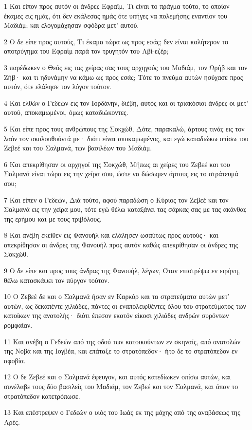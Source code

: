 \par 1 Και είπον προς αυτόν οι άνδρες Εφραΐμ, Τι είναι το πράγμα τούτο, το οποίον έκαμες εις ημάς, ότι δεν εκάλεσας ημάς ότε υπήγες να πολεμήσης εναντίον του Μαδιάμ; και ελογομάχησαν σφόδρα μετ' αυτού.
\par 2 Ο δε είπε προς αυτούς, Τι έκαμα τώρα ως προς εσάς; δεν είναι καλήτερον το αποτρύγημα του Εφραΐμ παρά τον τρυγητόν του Αβί-εζέρ;
\par 3 παρέδωκεν ο Θεός εις τας χείρας σας τους αρχηγούς του Μαδιάμ, τον Ωρήβ και τον Ζήβ· και τι ηδυνάμην να κάμω ως προς εσάς; Τότε το πνεύμα αυτών ησύχασε προς αυτόν, ότε ελάλησε τον λόγον τούτον.
\par 4 Και ελθών ο Γεδεών εις τον Ιορδάνην, διέβη, αυτός και οι τριακόσιοι άνδρες οι μετ' αυτού, αποκαμωμένοι, όμως καταδιώκοντες.
\par 5 Και είπε προς τους ανθρώπους της Σοκχώθ, Δότε, παρακαλώ, άρτους τινάς εις τον λαόν τον ακολουθούντά με· διότι είναι αποκαμωμένος, και εγώ καταδιώκω οπίσω του Ζεβεέ και του Σαλμανά, των βασιλέων του Μαδιάμ.
\par 6 Και απεκρίθησαν οι αρχηγοί της Σοκχώθ, Μήπως αι χείρες του Ζεβεέ και του Σαλμανά είναι τώρα εις την χείρα σου, ώστε να δώσωμεν άρτους εις το στράτευμά σου;
\par 7 Και είπεν ο Γεδεών, Διά τούτο, αφού παραδώση ο Κύριος τον Ζεβεέ και τον Σαλμανά εις την χείρα μου, τότε εγώ θέλω καταξάνει τας σάρκας σας με τας ακάνθας της ερήμου και με τους τριβόλους.
\par 8 Και ανέβη εκείθεν εις Φανουήλ και ελάλησεν ωσαύτως προς αυτούς· και απεκρίθησαν οι άνδρες της Φανουήλ προς αυτόν καθώς απεκρίθησαν οι άνδρες της Σοκχώθ.
\par 9 Ο δε είπε και προς τους άνδρας της Φανουήλ, λέγων, Όταν επιστρέψω εν ειρήνη, θέλω κατασκάψει τον πύργον τούτον.
\par 10 Ο Ζεβεέ δε και ο Σαλμανά ήσαν εν Καρκόρ και τα στρατεύματα αυτών μετ' αυτών, ως δεκαπέντε χιλιάδες, πάντες οι εναπολειφθέντες όλου του στρατεύματος των κατοίκων της ανατολής· διότι έπεσον εκατόν είκοσι χιλιάδες ανδρών συρόντων ρομφαίαν.
\par 11 Και ανέβη ο Γεδεών από της οδού των κατοικούντων εν σκηναίς, από ανατολών της Νοβά και της Ιογβέα, και επάταξε το στρατόπεδον· ήτο δε το στρατόπεδον εν αφοβία.
\par 12 Ο δε Ζεβεέ και ο Σαλμανά έφευγον, και αυτός κατεδίωκεν οπίσω αυτών, και συνέλαβε τους δύο βασιλείς του Μαδιάμ, τον Ζεβεέ και τον Σαλμανά, και άπαν το στρατόπεδον κατετρόπωσε.
\par 13 Και επέστρεψεν ο Γεδεών ο υιός του Ιωάς εκ της μάχης από της αναβάσεως της Αρές.
